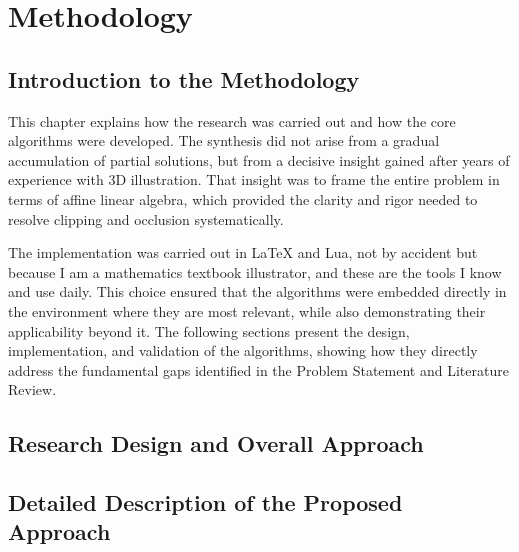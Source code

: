 \chapter{Methodology}

\section{Introduction to the Methodology}

This chapter explains how the research was carried out and how the 
core algorithms were developed. The synthesis did not arise from a 
gradual accumulation of partial solutions, but from a decisive 
insight gained after years of experience with \(3\)D illustration. 
That insight was to frame the entire problem in terms of affine 
linear algebra, which provided the clarity and rigor needed to 
resolve clipping and occlusion systematically.

The implementation was carried out in \LaTeX{} and Lua, not by 
accident but because I am a mathematics textbook illustrator, and 
these are the tools I know and use daily. This choice ensured that 
the algorithms were embedded directly in the environment where they 
are most relevant, while also demonstrating their applicability 
beyond it. The following sections present the design, implementation, 
and validation of the algorithms, showing how they directly address 
the fundamental gaps identified in the Problem Statement and 
Literature Review.

\section{Research Design and Overall Approach}

\section{Detailed Description of the Proposed Approach}

